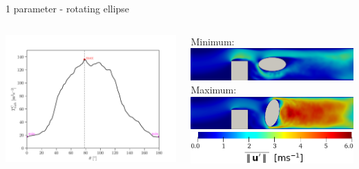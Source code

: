 \documentclass[aspectratio=169,xcolor=dvipsnames]{beamer}
\begin{document}
\begin{frame}{1 parameter - rotating ellipse}
	\addtocounter{framenumber}{-1}
	\begin{columns}
		\begin{column}{.56\textwidth}
			\includegraphics[width=1\linewidth, trim={0 0 0 0}, clip]{Images/elip2interpolated.pdf}			
		\end{column}
		\begin{column}{.52\textwidth}
			Minimum:\\[4pt]
			\includegraphics[width=0.9\linewidth, trim={0 0 0 0}, clip]{Images/ellipse2_min_aa.png}
			\\ \vspace{2mm}
			Maximum:\\[4pt]	
			\includegraphics[width=0.9\linewidth, trim={0 0 0 0}, clip]{Images/ellipse2_max_a.png}
			\\ \vspace{4mm}		
			\centering
			\hspace{-6mm}\includegraphics[width=0.6\linewidth, trim={0 0 0 0}, clip]{Images/ellipse12_legenda.png}
		\end{column}
	\end{columns}
\end{frame}
\end{document}
